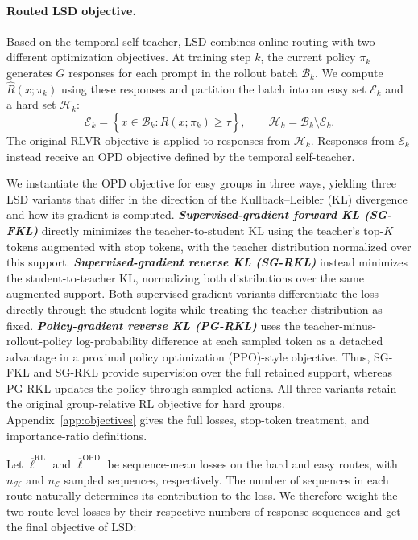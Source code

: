 \documentclass{article} %
\begin{document}
\paragraph{Routed LSD objective.} 
Based on the temporal self-teacher, LSD combines online routing with two different optimization objectives. At training step $k$, the current policy $\pi_k$ generates $G$ responses for each
prompt in the rollout batch $\mathcal B_k$. We compute
$\widehat R(x;\pi_k)$ using these responses and partition the batch into an easy set $\mathcal E_k$ and a hard set $\mathcal H_k$:
\begin{equation}
  \mathcal E_k
  =
  \left\{
    x\in\mathcal B_k:
    \widehat R(x;\pi_k)\ge\tau
  \right\},
  \qquad
  \mathcal H_k
  =
  \mathcal B_k\setminus\mathcal E_k.
  \label{eq:online-routing}
\end{equation}
The original RLVR objective is applied to responses from $\mathcal H_k$.
Responses from $\mathcal E_k$ instead receive an OPD objective defined by the
temporal self-teacher.

We instantiate the OPD objective for easy groups in three ways, yielding three LSD variants that differ in the direction of the Kullback--Leibler (KL) divergence and how its gradient is computed.
\textbf{\emph{Supervised-gradient forward KL (SG-FKL)}} directly minimizes the teacher-to-student KL using the teacher's top-$K$ tokens augmented with stop tokens, with the teacher distribution normalized over this support.
\textbf{\emph{Supervised-gradient reverse KL (SG-RKL)}} instead minimizes the student-to-teacher KL, normalizing both distributions over the same augmented support.
Both supervised-gradient variants differentiate the loss directly through the student logits while treating the teacher distribution as fixed.
\textbf{\emph{Policy-gradient reverse KL (PG-RKL)}} uses the teacher-minus-rollout-policy log-probability difference at each sampled token as a detached advantage in a proximal policy optimization (PPO)-style objective.
Thus, SG-FKL and SG-RKL provide supervision over the full retained support, whereas PG-RKL updates the policy through sampled actions.
All three variants retain the original group-relative RL objective for hard groups. Appendix~\ref{app:objectives} gives the full losses, stop-token treatment, and importance-ratio definitions.

Let $\overline{\ell}^{\mathrm{RL}}$ and $\overline{\ell}^{\mathrm{OPD}}$ be sequence-mean losses on the hard and easy routes, with $n_{\mathcal H}$ and $n_{\mathcal E}$ sampled sequences, respectively.
The number of sequences in each route naturally determines its contribution to the loss. We therefore weight the two route-level losses by their respective numbers of response sequences and get the final objective of LSD:
\end{document}
